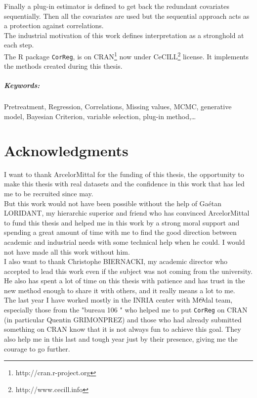 \documentclass[12pt,a4paper]{report}
\begin{document}
	Finally a plug-in estimator is defined to get back the redundant covariates sequentially. Then all the covariates are used but the sequential approach acts as a protection against correlations.
\\

	The industrial motivation of this work defines interpretation as a stronghold at each step. 	
	\\
	The R package {\tt CorReg}, is on CRAN\footnote{http://cran.r-project.org} now under CeCILL\footnote{http://www.cecill.info} license. It implements the methods created during this thesis.
	
	 	
\paragraph{Keywords:} Pretreatment, Regression, Correlations, Missing values, MCMC, generative model, Bayesian Criterion, variable selection, plug-in method,\dots
	

\chapter*{Acknowledgments}
	I want to thank ArcelorMittal for the funding of this thesis, the opportunity to make this thesis with real datasets and the confidence in this work that has led me to be recruited since may.%
	\\
	
	But this work would not have been possible without the help of Gaétan LORIDANT, my hierarchic superior and friend who has convinced ArcelorMittal to fund this thesis and helped me in this work by a strong moral support and spending a great amount of time with me to find the good direction between academic and industrial needs with some technical help when he could. I would not have made all this work without him.\\
	
	I also want to thank Christophe BIERNACKI, my academic director who accepted to lead this work even if the subject was not coming from the university. He also has spent a lot of time on this thesis with patience and has trust in the new method enough to share it with others, and it really means a lot to me. \\
	
	The last year I have worked mostly in the INRIA center with M$\Theta$dal team, especially those from the "bureau 106 " who helped me to put {\tt CorReg} on CRAN (in particular Quentin GRIMONPREZ) and those who had already submitted something on CRAN know that it is not always fun to achieve this goal. They also help me in this last and tough year just by their presence, giving me the courage to go further. \\
	
\end{document}
